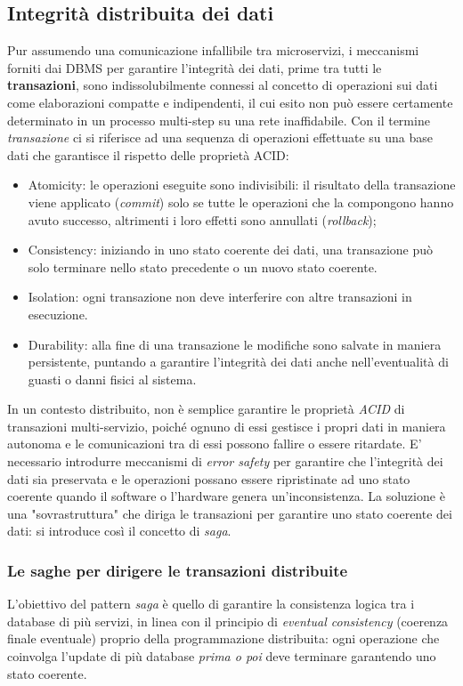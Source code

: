 \subsection{Integrità distribuita dei dati}
Pur assumendo una comunicazione infallibile tra microservizi, i meccanismi forniti dai DBMS per garantire l'integrità dei dati, prime tra tutti le \textbf{transazioni}, sono indissolubilmente connessi al concetto di operazioni sui dati come elaborazioni compatte e indipendenti, il cui esito non può essere certamente determinato in un processo multi-step su una rete inaffidabile.
Con il termine \emph{transazione} ci si riferisce ad una sequenza di operazioni effettuate su una base dati che garantisce il rispetto delle proprietà ACID:
\begin{itemize}
  \item Atomicity: le operazioni eseguite sono indivisibili: il risultato della transazione viene applicato (\emph{commit}) solo se tutte le operazioni che la compongono hanno avuto successo, altrimenti i loro effetti sono annullati (\emph{rollback});
  \item Consistency: iniziando in uno stato coerente dei dati, una transazione può solo terminare nello stato precedente o un nuovo stato coerente.
  \item Isolation: ogni transazione non deve interferire con altre transazioni in esecuzione.
  \item Durability: alla fine di una transazione le modifiche sono salvate in maniera persistente, puntando a garantire l'integrità dei dati anche nell'eventualità di guasti o danni fisici al sistema.
\end{itemize}

In un contesto distribuito, non è semplice garantire le proprietà \emph{ACID} di transazioni multi-servizio, poiché ognuno di essi gestisce i propri dati in maniera autonoma e le comunicazioni tra di essi possono fallire o essere ritardate. E' necessario introdurre meccanismi di \emph{error safety} per garantire che l'integrità dei dati sia preservata e le operazioni possano essere ripristinate ad uno stato coerente quando il software o l'hardware genera un'inconsistenza.
La soluzione è una "sovrastruttura" che diriga le transazioni per garantire uno stato coerente dei dati: si introduce così il concetto di \emph{saga}.

\subsubsection{Le saghe per dirigere le transazioni distribuite}
L'obiettivo del pattern \emph{saga} è quello di garantire la consistenza logica tra i database di più servizi, in linea con il principio di \emph{eventual consistency} (coerenza finale eventuale) proprio della programmazione distribuita: ogni operazione che coinvolga l'update di più database \emph{prima o poi} deve terminare garantendo uno stato coerente.

